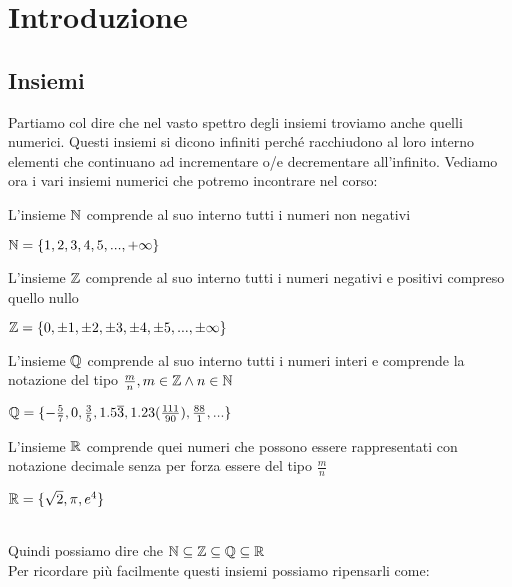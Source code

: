 \chapter{Introduzione}
\section{Insiemi}
Partiamo col dire che nel vasto spettro degli insiemi troviamo anche quelli numerici. Questi insiemi si dicono infiniti 
perché racchiudono al loro interno elementi che continuano ad incrementare o/e decrementare all'infinito. Vediamo ora i 
vari insiemi numerici che potremo incontrare nel corso:\\
\begin{definizione}\label{nnaturali}
  L'insieme $\mathbb{\MakeUppercase{n}}$ comprende al suo interno tutti i numeri non negativi\\
  \begin{es}
   $\mathbb{\MakeUppercase{n}}=\{1,2,3,4,5,...,+\infty\}$
  \end{es}
\end{definizione}

\begin{definizione}\label{ninteri}
  L'insieme $\mathbb{\MakeUppercase{z}}$ comprende al suo interno tutti i numeri negativi e positivi compreso quello nullo\\
  \begin{es}
   $\mathbb{\MakeUppercase{z}}=\{0,\pm1,\pm2,\pm3,\pm4,\pm5,...,\pm\infty\}$
  \end{es}
\end{definizione}

\begin{definizione}\label{nrazionali}
  L'insieme $\mathbb{\MakeUppercase{q}}$ comprende al suo interno tutti i numeri interi e comprende la notazione del tipo $\frac{m}{n}, m\in\mathbb{\MakeUppercase{z}} \wedge n\in\mathbb{\MakeUppercase{n}}$\\
  \begin{es}
   $\mathbb{\MakeUppercase{q}}=\{-\frac{5}{7},0,\frac{3}{5},1.5\overline{3},1.23(\frac{111}{90}),\frac{88}{1},...\}$
  \end{es}
\end{definizione}

\begin{definizione}\label{nreali}
  L'insieme $\mathbb{\MakeUppercase{r}}$ comprende quei numeri che possono essere rappresentati con notazione decimale senza per forza essere del tipo $\frac{m}{n}$ \\
  \begin{es}
   $\mathbb{\MakeUppercase{r}}=\{\sqrt{2},\pi,e^{4}\}$
  \end{es}
\end{definizione}
\leavevmode\\
Quindi possiamo dire che $\mathbb{\MakeUppercase{n}}\subseteq\mathbb{\MakeUppercase{z}}\subseteq\mathbb{\MakeUppercase{q}}\subseteq\mathbb{\MakeUppercase{r}}$
\leavevmode\\
Per ricordare più facilmente questi insiemi possiamo ripensarli come:

